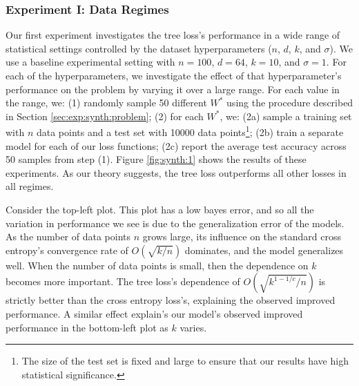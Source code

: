 \documentclass[twoside]{article}
\DeclareMathOperator*{\argmin}{arg\,min}
\renewcommand{\star}[1]{{#1}^{*}}
\newcommand{\x}{\mathbf x}
\begin{document}


\subsubsection{Experiment I: Data Regimes}
\label{sec:synth:1}

Our first experiment investigates the tree loss's performance in a wide range of statistical settings controlled by the dataset hyperparameters ($n$, $d$, $k$, and $\sigma$).
We use a baseline experimental setting with $n=100$, $d=64$, $k=10$, and $\sigma=1$.
For each of the hyperparameters, we investigate the effect of that hyperparameter's performance on the problem by varying it over a large range.
For each value in the range, we:
(1) randomly sample 50 different $\star W$ using the procedure described in Section \ref{sec:exp:synth:problem};
(2) for each $\star W$, we:
(2a) sample a training set with $n$ data points and a test set with 10000 data points\footnote{The size of the test set is fixed and large to ensure that our results have high statistical significance.};
(2b) train a separate model for each of our loss functions;
(2c) report the average test accuracy across 50 samples from step (1).
Figure \ref{fig:synth:1} shows the results of these experiments.
As our theory suggests, the tree loss outperforms all other losses in all regimes.

Consider the top-left plot.
This plot has a low bayes error, and so all the variation in performance we see is due to the generalization error of the models.
As the number of data points $n$ grows large,
its influence on the standard cross entropy's convergence rate of $O(\sqrt{k/n})$ dominates,
and the model generalizes well.
When the number of data points is small, %
then the dependence on $k$ becomes more important.
The tree loss's dependence of $O(\sqrt{k^{1-1/c}/n})$ is strictly better than the cross entropy loss's,
explaining the observed improved performance.
A similar effect explain's our model's observed improved performance in the bottom-left plot as $k$ varies.
\end{document}
